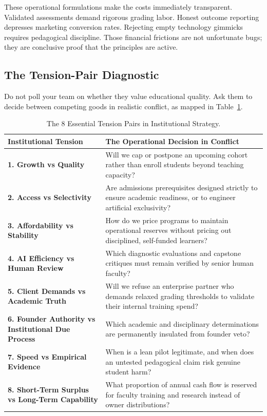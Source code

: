 These operational formulations make the costs immediately transparent. Validated assessments demand rigorous grading labor. Honest outcome reporting depresses marketing conversion rates. Rejecting empty technology gimmicks requires pedagogical discipline. Those financial frictions are not unfortunate bugs; they are conclusive proof that the principles are active.

\subsection{The Tension-Pair Diagnostic}

Do not poll your team on whether they value educational quality. Ask them to decide between competing goods in realistic conflict, as mapped in Table~\ref{tab:tension-pairs}.

\begin{table}[htbp]
\centering
\begin{tcolorbox}[
  enhanced,
  colback=white,
  colframe=BayesBorder!80!white,
  boxrule=0.4pt,
  arc=2pt,
  left=3pt,right=3pt,top=3pt,bottom=3pt,
  before skip=3pt,after skip=4pt
]
\scriptsize
\setlength{\tabcolsep}{3pt}
\renewcommand{\arraystretch}{1.18}
\begin{tabularx}{\linewidth}{@{} >{\bfseries\color{BayesInk}}p{2.3cm} >{\color{BayesInk}}X @{}}
\toprule
\textbf{Institutional Tension} & \textbf{The Operational Decision in Conflict} \\
\midrule
1. Growth vs Quality & Will we cap or postpone an upcoming cohort rather than enroll students beyond teaching capacity? \\
\midrule
2. Access vs Selectivity & Are admissions prerequisites designed strictly to ensure academic readiness, or to engineer artificial exclusivity? \\
\midrule
3. Affordability vs Stability & How do we price programs to maintain operational reserves without pricing out disciplined, self-funded learners? \\
\midrule
4. AI Efficiency vs Human Review & Which diagnostic evaluations and capstone critiques must remain verified by senior human faculty? \\
\midrule
5. Client Demands vs Academic Truth & Will we refuse an enterprise partner who demands relaxed grading thresholds to validate their internal training spend? \\
\midrule
6. Founder Authority vs Institutional Due Process & Which academic and disciplinary determinations are permanently insulated from founder veto? \\
\midrule
7. Speed vs Empirical Evidence & When is a lean pilot legitimate, and when does an untested pedagogical claim risk genuine student harm? \\
\midrule
8. Short-Term Surplus vs Long-Term Capability & What proportion of annual cash flow is reserved for faculty training and research instead of owner distributions? \\
\bottomrule
\end{tabularx}
\end{tcolorbox}
\caption{The 8 Essential Tension Pairs in Institutional Strategy.}
\label{tab:tension-pairs}
\end{table}

